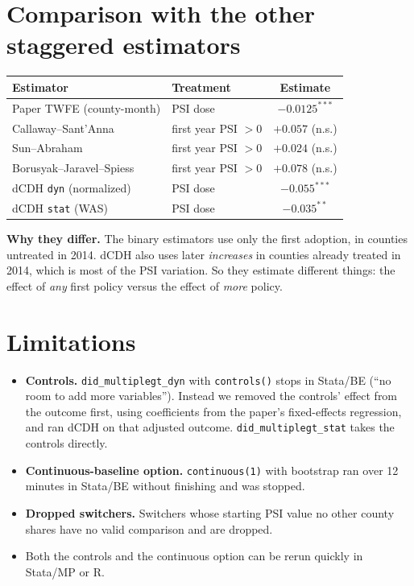 \documentclass[11pt]{article}
\begin{document}
\section{Comparison with the other staggered estimators}
\begin{center}\small
\begin{tabular}{llc}
\toprule
Estimator & Treatment & Estimate \\
\midrule
Paper TWFE (county-month) & PSI dose & $-0.0125^{***}$ \\
Callaway--Sant'Anna & first year PSI $>0$ & $+0.057$ (n.s.) \\
Sun--Abraham & first year PSI $>0$ & $+0.024$ (n.s.) \\
Borusyak--Jaravel--Spiess & first year PSI $>0$ & $+0.078$ (n.s.) \\
dCDH \texttt{dyn} (normalized) & PSI dose & $-0.055^{***}$ \\
dCDH \texttt{stat} (WAS) & PSI dose & $-0.035^{**}$ \\
\bottomrule
\end{tabular}
\end{center}
\textbf{Why they differ.} The binary estimators use only the first adoption, in counties untreated in 2014. dCDH also uses later \emph{increases} in counties already treated in 2014, which is most of the PSI variation. So they estimate different things: the effect of \emph{any} first policy versus the effect of \emph{more} policy.

\section{Limitations}
\begin{itemize}[leftmargin=14pt,itemsep=2pt]
\item \textbf{Controls.} \texttt{did\_multiplegt\_dyn} with \texttt{controls()} stops in Stata/BE (``no room to add more variables''). Instead we removed the controls' effect from the outcome first, using coefficients from the paper's fixed-effects regression, and ran dCDH on that adjusted outcome. \texttt{did\_multiplegt\_stat} takes the controls directly.
\item \textbf{Continuous-baseline option.} \texttt{continuous(1)} with bootstrap ran over 12 minutes in Stata/BE without finishing and was stopped.
\item \textbf{Dropped switchers.} Switchers whose starting PSI value no other county shares have no valid comparison and are dropped.
\item Both the controls and the continuous option can be rerun quickly in Stata/MP or R.
\end{itemize}
\end{document}
